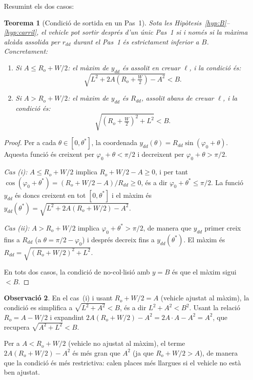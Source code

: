 \documentclass[11pt, a4paper]{article}
\theoremstyle{plain}
\newtheorem{theorem}{Teorema}[section]
\theoremstyle{definition}
\newtheorem{remark}[theorem]{Observaci\'o}
\newcommand{\Ro}{R_o}
\begin{document}
Resumint els dos casos:

\begin{theorem}[Condici\'o de sortida en un Pas~1]\label{thm:1pas}
Sota les Hip\`otesis~\ref{hyp:B}--\ref{hyp:carril}, el vehicle pot sortir
despr\'es d'un \'unic Pas~1 si i nom\'es si la m\`axima alc\`ada assolida per
$r_{dd}$ durant el Pas~1 \'es estrictament inferior a $B$. Concretament:
\begin{enumerate}[noitemsep,label=(\roman*)]
  \item Si $A\leq\Ro+W/2$: el m\`axim de $y_{dd}$ \'es assolit en creuar
        $\ell$, i la condici\'o \'es:
        \[
          \sqrt{L^2+2A\!\left(\Ro+\tfrac{W}{2}\right)-A^2} < B.
        \]
  \item Si $A>\Ro+W/2$: el m\`axim de $y_{dd}$ \'es $R_{dd}$, assolit
        abans de creuar $\ell$, i la condici\'o \'es:
        \[
          \sqrt{\left(\Ro+\tfrac{W}{2}\right)^{\!2}+L^2} < B.
        \]
\end{enumerate}
\end{theorem}

\begin{proof}
Per a cada $\theta\in[0,\theta^*]$, la coordenada $y_{dd}(\theta)=R_{dd}
\sin(\varphi_0+\theta)$. Aquesta funci\'o \'es creixent per
$\varphi_0+\theta<\pi/2$ i decreixent per $\varphi_0+\theta>\pi/2$.

\emph{Cas (i):} $A\leq\Ro+W/2$ implica $\Ro+W/2-A\geq 0$, i per tant
$\cos(\varphi_0+\theta^*)=(\Ro+W/2-A)/R_{dd}\geq 0$, \'es a dir
$\varphi_0+\theta^*\leq\pi/2$. La funci\'o $y_{dd}$ \'es doncs creixent en
tot $[0,\theta^*]$ i el m\`axim \'es $y_{dd}(\theta^*)=
\sqrt{L^2+2A(\Ro+W/2)-A^2}$.

\emph{Cas (ii):} $A>\Ro+W/2$ implica $\varphi_0+\theta^*>\pi/2$, de manera
que $y_{dd}$ primer creix fins a $R_{dd}$ (a $\theta=\pi/2-\varphi_0$) i
despr\'es decreix fins a $y_{dd}(\theta^*)$. El m\`axim \'es $R_{dd}=
\sqrt{(\Ro+W/2)^2+L^2}$.

En tots dos casos, la condici\'o de no-col$\cdot$lisi\'o amb $y=B$ \'es que
el m\`axim sigui $<B$.
\end{proof}

\begin{remark}
En el cas~(i) i usant $\Ro+W/2=A$ (vehicle ajustat al m\`axim), la condici\'o
es simplifica a $\sqrt{L^2+A^2}<B$, \'es a dir $L^2+A^2<B^2$. Usant la
relaci\'o $\Ro=A-W/2$ i expandint $2A(\Ro+W/2)-A^2 = 2A\cdot A - A^2 = A^2$,
que recupera $\sqrt{A^2+L^2}<B$.

Per a $A<\Ro+W/2$ (vehicle no ajustat al m\`axim), el terme
$2A(\Ro+W/2)-A^2$ \'es m\'es gran que $A^2$ (ja que $\Ro+W/2>A$), de manera
que la condici\'o \'es m\'es restrictiva: calen places m\'es llargues si el
vehicle no est\`a ben ajustat.
\end{remark}
\end{document}
